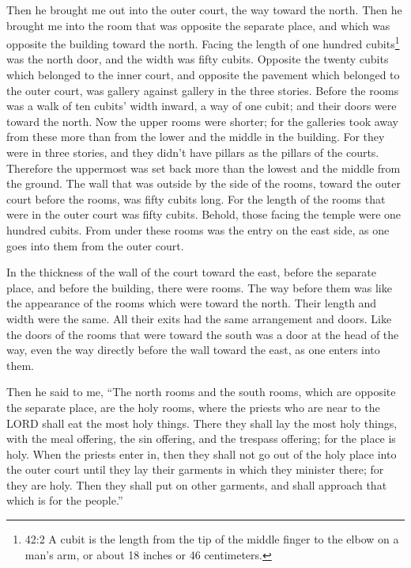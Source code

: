 \mychapter{} \myverse*{}Then he brought me out into the outer court, the way toward the
north. Then he brought me into the room that was opposite the separate place, and which was opposite the
building toward the north.
\myverse{}Facing the length of one hundred cubits\footnote{42:2 A cubit is the length from the tip of the middle finger to the elbow on a man’s arm, or about
	18 inches or 46 centimeters.} was the north door, and the width was fifty cubits.
\myverse{}Opposite the twenty cubits which belonged to the inner court, and opposite
the pavement which belonged to the outer court, was gallery against gallery in the three stories.
\myverse{}Before the rooms was a walk of ten cubits’ width inward, a way of one cubit;
and their doors were toward the north.
\myverse{}Now the upper rooms were shorter; for the galleries took away from these more
than from the lower and the middle in the building.
\myverse{}For they were in three stories, and they didn’t have pillars as the pillars
of the courts. Therefore the uppermost was set back more than the lowest and the middle from the ground.
\myverse{}The wall that was outside by the side of the rooms, toward the outer court
before the rooms, was fifty cubits long.
\myverse{}For the length of the rooms that were in the outer court was fifty cubits.
Behold, those facing the temple were one hundred cubits.
\myverse{}From under these rooms was the entry on the east side, as one goes into them
from the outer court.

\myverse{}In the thickness of the wall of the court toward the east, before
the separate place, and before the building, there were rooms.
\myverse{}The way before them was like the appearance of the rooms which were toward
the north. Their length and width were the same. All their exits had the same arrangement and doors.
\myverse{}Like the doors of the rooms that were toward the south was a door at the
head of the way, even the way directly before the wall toward the east, as one enters into them.

\myverse{}Then he said to me, “The north rooms and the south rooms, which
are opposite the separate place, are the holy rooms, where the priests who are near to the LORD shall
eat the most holy things. There they shall lay the most holy things, with the meal offering, the sin offering,
and the trespass offering; for the place is holy.
\myverse{}When the priests enter in, then they shall not go out of the holy place into
the outer court until they lay their garments in which they minister there; for they are holy. Then they
shall put on other garments, and shall approach that which is for the people.”

